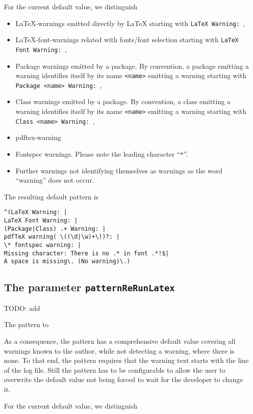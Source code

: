 For the current default value, we distinguish 
%
\begin{itemize}
\item
\LaTeX-warnings emitted directly by \LaTeX 
starting with \texttt{LaTeX Warning: }, 
\item
\LaTeX-font-warnings related with fonts/font selection 
starting with \texttt{LaTeX Font Warning: }, 
\item
Package warnings emitted by a package. 
By convention, a package emitting a warning identifies itself 
by its name \texttt{<name>}
emitting a warning starting with \texttt{Package <name> Warning: }, 
\item
Class warnings emitted by a package. 
By convention, a class emitting a warning identifies itself 
by its name \texttt{<name>}
emitting a warning starting with \texttt{Class <name> Warning: }, 
\item
pdftex-warning 
\item
Fontspec warnings. Please note the leading character ``\texttt{*}''. 
\item
Further warnings not identifying themselves as warnings 
as the word ``warning'' does not occur. 
\end{itemize}

The resulting default pattern is 
%
\begin{Verbatim}
^(LaTeX Warning: |
LaTeX Font Warning: |
(Package|Class) .+ Warning: |
pdfTeX warning( \((\d|\w)+\))?: |
\* fontspec warning: |
Missing character: There is no .* in font .*!$|
A space is missing\. (No warning)\.)
\end{Verbatim}


\subsection{The parameter \texttt{patternReRunLatex}}
\label{subsec:patternReRunLatex}
TODO\@: add 

The pattern to 

As a consequence, the pattern has a comprehensive default value 
covering all warnings known to the author, 
while not detecting a warning, where there is none. 
To that end, the pattern requires 
that the warning text starts with the line of the log file. 
Still the pattern has to be configurable 
to allow the user to overwrite the default value 
not being forced to wait for the developer to change it. 

For the current default value, we distinguish 

